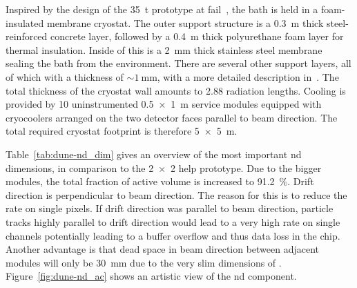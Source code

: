 Inspired by the design of the \dune{} \SI{35}{\tonne} prototype at \gls{fail}~\cite{dune4}, the \lar{} bath is held in a foam-insulated membrane cryostat.
The outer support structure is a \SI{0.3}{\metre} thick steel-reinforced concrete layer, followed by a \SI{0.4}{\metre} thick polyurethane foam layer for thermal insulation.
Inside of this is a \SI{2}{\milli\metre} thick stainless steel membrane sealing the \lar{} bath from the environment.
There are several other support layers, all of which with a thickness of $\sim{\SI{1}{\milli\metre}}$, with a more detailed description in~\cite{dune4}.
The total thickness of the cryostat wall amounts to \num{2.88} radiation lengths.
Cooling is provided by \num{10} uninstrumented \SI{0.5 x 1}{\metre} service modules equipped with cryocoolers arranged on the two detector faces parallel to beam direction.
The total required cryostat footprint is therefore \SI{5 x 5}{\metre}.

Table~\ref{tab:dune-nd_dim} gives an overview of the most important \AC{} \gls{nd} dimensions, in comparison to the \num{2 x 2} \gls{help} prototype.
Due to the bigger modules, the total fraction of active volume is increased to \SI{91.2}{\percent}.
Drift direction is perpendicular to beam direction.
The reason for this is to reduce the rate on single pixels.
If drift direction was parallel to beam direction, particle tracks highly parallel to drift direction would lead to a very high rate on single channels potentially leading to a buffer overflow and thus data loss in the \larpix{} chip.
Another advantage is that dead space in beam direction between adjacent modules will only be \SI{30}{\milli\metre} due to the very slim dimensions of \AL{}.
Figure~\ref{fig:dune-nd_ac} shows an artistic view of the \AC{} \gls{nd} component.